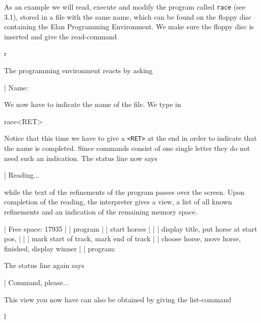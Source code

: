 As an example we will read, execute and modify the program called
{\tt race} (see 3.1), stored in a file
with the same name, which can be found on the floppy disc containing
the Elan Programming Environment.
We make sure the floppy disc is inserted and give the read-command

\begin{elan}
        r
\end{elan}

\noindent
The programming environment reacts by asking

\begin{elan}
|       Name:\cursor
\end{elan}

\noindent
We now have to indicate the name of the file. We type in

\begin{elan}
        race<RET>
\end{elan}

\noindent
Notice that this time we have to give a {\tt <RET>} at the end in order
to indicate that the name is completed. Since commands consist
of one single letter they do not need such an indication.
The status line now says

\begin{elan}
|                               Reading...
\end{elan}

\noindent
while the text of the refinements of the program passes over
the screen. Upon completion of the reading, the interpreter gives
a view, a list of all known refinements and an indication
of the remaining memory space.

\begin{elan}
|       Free space:  17935
|
|       program
|       | start horses
|       | | display title, put horse at start pos,
|       | | mark start of track, mark end of track
|       | choose horse, move horse, finished, display winner
|
|       program:\cursor
\end{elan}

\noindent
The status line again says

\begin{elan}
|                               Command, please...
\end{elan}

\noindent
This view you now have can also be obtained by giving the
list-command

\begin{elan}
        l
\end{elan}

